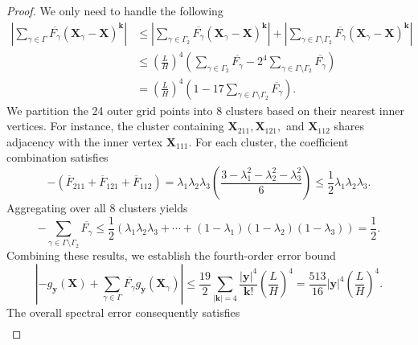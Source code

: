 \documentclass[review,onefignum,onetabnum]{siamart250211}
\begin{document}
\begin{proof}
We only need to handle the following
\begin{equation}
\begin{aligned}
\left| \sum_{\gamma \in \Gamma} \overline{F_{\gamma}} (\mathbf{X}_\gamma - \mathbf{X})^{\mathbf{k}} \right| 
&\leq \left| \sum_{\gamma \in \Gamma_2} \overline{F_{\gamma}} (\mathbf{X}_\gamma - \mathbf{X})^{\mathbf{k}} \right| 
   + \left| \sum_{\gamma \in \Gamma \setminus \Gamma_2} \overline{F_{\gamma}} (\mathbf{X}_\gamma - \mathbf{X})^{\mathbf{k}} \right| \\
&\leq \left( \frac{L}{H} \right)^4 \left( \sum_{\gamma \in \Gamma_2} \overline{F_{\gamma}} 
   -2^4 \sum_{\gamma \in \Gamma \setminus \Gamma_2} \overline{F_{\gamma}} \right) \\
&= \left( \frac{L}{H} \right)^4 \left( 1 -17 \sum_{\gamma \in \Gamma \setminus \Gamma_2} \overline{F_{\gamma}} \right).
\end{aligned}
\end{equation}
We partition the 24 outer grid points into 8 clusters based on their nearest inner vertices. For instance, the cluster containing \( \mathbf{X}_{211}, \mathbf{X}_{121}, \) and \( \mathbf{X}_{112} \) shares adjacency with the inner vertex \( \mathbf{X}_{111} \).
For each cluster, the coefficient combination satisfies
\begin{equation}
-(\overline{F}_{211} + \overline{F}_{121} + \overline{F}_{112}) = \lambda_1 \lambda_2 \lambda_3 \left( \frac{3 - \lambda_1^2 - \lambda_2^2 - \lambda_3^2}{6} \right) \leq \frac{1}{2} \lambda_1 \lambda_2 \lambda_3.
\end{equation}
Aggregating over all 8 clusters yields
\begin{equation}
-\sum_{\gamma \in \Gamma \setminus \Gamma_2} \overline{F_{\gamma}} \leq \frac{1}{2} \left( \lambda_1 \lambda_2 \lambda_3 + \cdots + (1 - \lambda_1)(1 - \lambda_2)(1 - \lambda_3) \right) = \frac{1}{2}. 
\end{equation}
Combining these results, we establish the fourth-order error bound
\begin{equation}
\label{eq:PIC4}
\left|-g_\mathbf{y}(\mathbf{X}) + \sum_{\gamma \in \Gamma} \overline{F_{\gamma}} g_\mathbf{y}(\mathbf{X}_\gamma) \right| \leq \frac{19}{2} \sum_{|\mathbf{k}| = 4} \frac{|\mathbf{y}|^4}{\mathbf{k}!} \left( \frac{L}{H} \right)^4 = \frac{513}{16} |\mathbf{y}|^4 \left( \frac{L}{H} \right)^4.
\end{equation}
The overall spectral error consequently satisfies
\begin{equation}
\begin{aligned}

\end{aligned}
\end{equation}
\end{proof}
\end{document}
